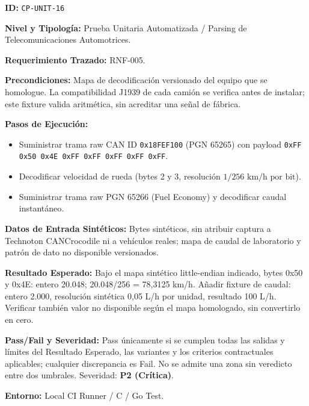\par\noindent\textbf{ID:} \texttt{CP-\allowbreak{}UNIT-\allowbreak{}16}\par
\par\noindent\textbf{Nivel y Tipología:} Prueba Unitaria Automatizada / Parsing de Telecomunicaciones Automotrices.\par
\par\noindent\textbf{Requerimiento Trazado:} RNF-005.\par
\par\noindent\textbf{Precondiciones:} Mapa de decodificación versionado del equipo que se homologue. La compatibilidad J1939 de cada camión se verifica antes de instalar; este fixture valida aritmética, sin acreditar una señal de fábrica.\par
\par\noindent\textbf{Pasos de Ejecución:}\par
\begin{itemize}
\item Suministrar trama raw CAN ID \texttt{0x18FEF100} (PGN 65265) con payload \texttt{0xFF 0x50 0x4E 0xFF 0xFF 0xFF 0xFF 0xFF}.
\item Decodificar velocidad de rueda (bytes 2 y 3, resolución \(1/256\text{ km/h por bit}\)).
\item Suministrar trama raw PGN 65266 (Fuel Economy) y decodificar caudal instantáneo.
\end{itemize}

\par\noindent\textbf{Datos de Entrada Sintéticos:} Bytes sintéticos, sin atribuir captura a Technoton CANCrocodile ni a vehículos reales; mapa de caudal de laboratorio y patrón de dato no disponible versionados.\par
\par\noindent\textbf{Resultado Esperado:} Bajo el mapa sintético little-endian indicado, bytes 0x50 y 0x4E: entero 20.048; 20.048/256 = 78,3125 km/h. Añadir fixture de caudal: entero 2.000, resolución sintética 0,05 L/h por unidad, resultado 100 L/h. Verificar también valor no disponible según el mapa homologado, sin convertirlo en cero.\par
\par\noindent\textbf{Pass/Fail y Severidad:} Pass únicamente si se cumplen todas las salidas y límites del Resultado Esperado, las variantes y los criterios contractuales aplicables; cualquier discrepancia es Fail. No se admite una zona sin veredicto entre dos umbrales. Severidad: \textbf{P2 (Crítica)}.\par
\par\noindent\textbf{Entorno:} Local CI Runner / C / Go Test.\par

